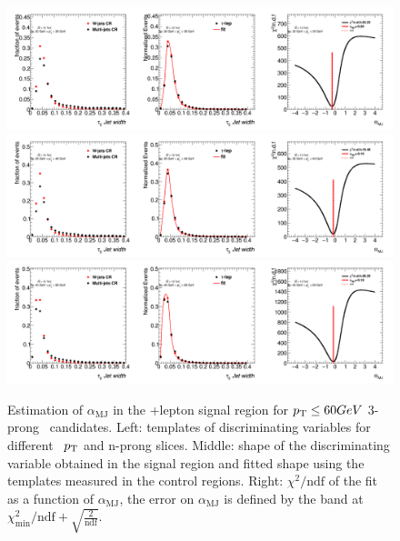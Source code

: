 	\begin{figure}
	\begin{center}
	\includegraphics[width=1\textwidth]{chapters/chapter6_HPlus/images/FFs/FFs_FIT_SR_TAULEP_3_30_35.png}
	\includegraphics[width=1\textwidth]{chapters/chapter6_HPlus/images/FFs/FFs_FIT_SR_TAULEP_3_35_40.png}
	\includegraphics[width=1\textwidth]{chapters/chapter6_HPlus/images/FFs/FFs_FIT_SR_TAULEP_3_40_60.png}
	\end{center}
	\caption{
	Estimation of $\alpha_\mathrm{MJ}$ in the \tauhad+lepton signal region for $p_{\text{T}} \leq 60 GeV$
	3-prong \tauhad\ candidates. Left: templates of discriminating variables for different \tauhad\ $p_{\text{T}}$
	and n-prong slices. Middle: shape of the discriminating variable obtained in the signal region and fitted
	shape using the templates measured in the control regions. Right: $\chi^2/\mathrm{ndf}$ of the fit as a
	function of $\alpha_\mathrm{MJ}$, the error on $\alpha_\mathrm{MJ}$ is defined by the band at
	$\chi^2_\mathrm{min}/\mathrm{ndf}+\sqrt{\frac{2}{\mathrm{ndf}}}$.
	}
	\label{fig:mm:Fits:region7_3}
	\end{figure}

